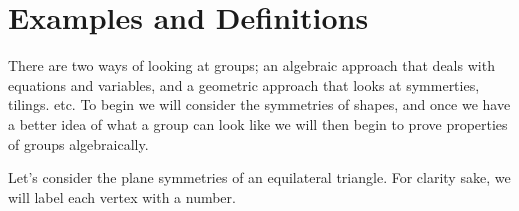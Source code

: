 \documentclass{article}
\begin{document}
\tableofcontents


\section{Examples and Definitions}

There are two ways of looking at groups; an algebraic approach that deals with equations and variables, and a geometric approach that looks at symmerties, tilings. etc. To begin we will consider the symmetries of shapes, and once we have a better idea of what a group can look like we will then begin to prove properties of groups algebraically.

Let's consider the plane symmetries of an equilateral triangle. For clarity sake, we will label each vertex with a number.
\begin{center}
\end{center}
\end{document}
